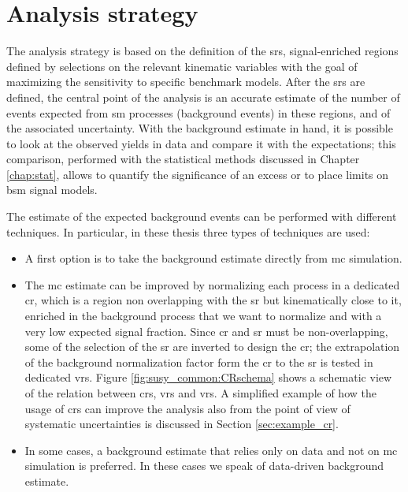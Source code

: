 \section{Analysis strategy}

The analysis strategy is based on the definition of the \glspl{sr}, signal-enriched regions defined by selections on the relevant kinematic variables with the goal of maximizing the sensitivity to specific benchmark models. 
After the \glspl{sr} are defined, the central point of the analysis is an accurate estimate of the number of events expected from \gls{sm} processes (background events) in these regions, and of the associated uncertainty. 
With the background estimate in hand, it is possible to look at the observed yields in data and compare it with the expectations;
this comparison, performed with the statistical methods discussed in Chapter \ref{chap:stat}, allows to quantify the significance of an excess or to place limits on \gls{bsm} signal models.

The estimate of the expected background events can be performed with different techniques. In particular, in these thesis three types of techniques are used:
\begin{itemize}
\item A first option is to take the background estimate directly from \gls{mc} simulation. 
\item The \gls{mc} estimate can be improved by normalizing each process in a dedicated \gls{cr}, which is a region non overlapping with the \gls{sr} but kinematically close to it, enriched in the background process that we want to normalize and with a very low expected signal fraction. Since \gls{cr} and \gls{sr} must be non-overlapping, some of the selection of the \gls{sr} are inverted to design the \gls{cr}; the extrapolation of the background normalization factor form the \gls{cr} to the \gls{sr} is tested in dedicated \glspl{vr}. Figure \ref{fig:susy_common:CRschema} shows a schematic view of the relation between \glspl{cr}, \glspl{vr} and \glspl{vr}. A simplified example of how the usage of \glspl{cr} can improve the analysis also from the point of view of systematic uncertainties is discussed in Section \ref{sec:example_cr}. 
\item In some cases, a background estimate that relies only on data and not on \gls{mc} simulation is preferred. In these cases we speak of data-driven background estimate.
\end{itemize}

